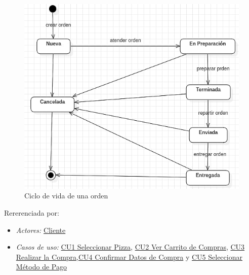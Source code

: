 \begin{figure}[h]
	
	\begin{center}				
		
		\includegraphics[scale=0.50]{imagenes/CiclosDeVida/cv-Orden.png}
		\caption{Ciclo de vida de una orden}
		\label{fig:CV:Orden}
		
	\end{center}
	
\end{figure}
		\noindent Rererenciada por: 
		
			\begin{itemize}

				\item \textit{Actores:} \hyperlink{A:Cliente}{Cliente}

				\item \textit{Casos de uso:} \hyperlink{CU1}{CU1 Seleccionar Pizza}, \hyperlink{CU2}{CU2 Ver Carrito de Compras}, \hyperlink{CU3}{CU3 Realizar la Compra},\hyperlink{CU4}{CU4 Confirmar Datos de Compra} y \hyperlink{CU5}{CU5 Seleccionar Método de Pago}

			\end{itemize}

